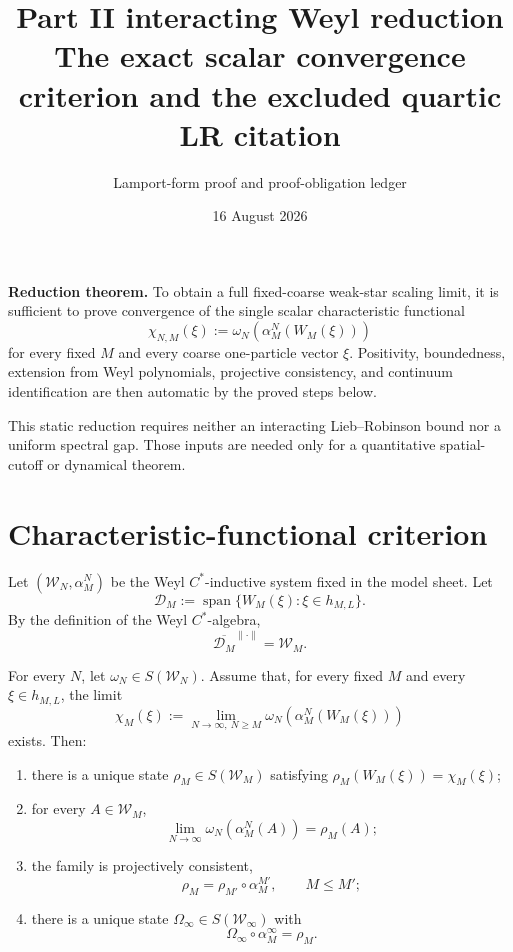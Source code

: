 \documentclass[11pt,a4paper]{article}
\title{Part II interacting Weyl reduction\\[3pt]
\large The exact scalar convergence criterion and the excluded quartic LR citation}
\author{Lamport-form proof and proof-obligation ledger}
\date{16 August 2026}
\newcommand{\W}{\mathcal W}
\begin{document}
\maketitle

\begin{resultbox}
\textbf{Reduction theorem.}  To obtain a full
fixed-coarse weak-star scaling limit, it is sufficient to prove convergence of the
single scalar characteristic functional
\[
 \chi_{N,M}(\xi):=\omega_N(\alpha_M^N(W_M(\xi)))
\]
for every fixed \(M\) and every coarse one-particle vector \(\xi\).  Positivity,
boundedness, extension from Weyl polynomials, projective consistency, and continuum
identification are then automatic by the proved steps below.

This static reduction requires neither an interacting Lieb--Robinson bound nor a
uniform spectral gap.  Those inputs are needed only for a quantitative spatial-cutoff
or dynamical theorem.
\end{resultbox}

\tableofcontents

\section{Characteristic-functional criterion}

Let \((\W_N,\alpha_M^N)\) be the Weyl \(C^*\)-inductive system fixed in the
model sheet.  Let
\[
 \mathcal D_M:=\operatorname{span}\{W_M(\xi):\xi\in h_{M,L}\}.   \tag{1.1}
\]
By the definition of the Weyl \(C^*\)-algebra,
\[
 \overline{\mathcal D_M}^{\|\cdot\|}=\W_M.                     \tag{1.2}
\]

\begin{theorem}\label{thm:weylcriterion}
For every \(N\), let \(\omega_N\in S(\W_N)\).  Assume that, for every fixed
\(M\) and every \(\xi\in h_{M,L}\), the limit
\[
 \chi_M(\xi):=
 \lim_{N\to\infty,\ N\ge M}
 \omega_N(\alpha_M^N(W_M(\xi)))                               \tag{1.3}
\]
exists.  Then:
\begin{enumerate}
\item there is a unique state \(\rho_M\in S(\W_M)\) satisfying
      \(\rho_M(W_M(\xi))=\chi_M(\xi)\);
\item for every \(A\in\W_M\),
      \[
       \lim_{N\to\infty}\omega_N(\alpha_M^N(A))=\rho_M(A);     \tag{1.4}
      \]
\item the family is projectively consistent,
      \[
       \rho_M=\rho_{M'}\circ\alpha_M^{M'},\qquad M\le M';      \tag{1.5}
      \]
\item there is a unique state \(\Omega_\infty\in S(\W_\infty)\) with
      \[
       \Omega_\infty\circ\alpha_M^\infty=\rho_M.               \tag{1.6}
      \]
\end{enumerate}
\end{theorem}
\end{document}
